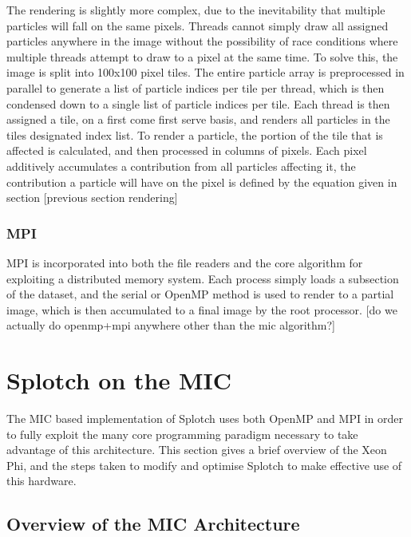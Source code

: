 \documentclass[runningheads,a4paper]{llncs}
\begin{document}
The rendering is slightly more complex, due to the inevitability that multiple particles will fall on the same pixels. 
Threads cannot simply draw all assigned particles anywhere in the image without the possibility of race conditions 
where multiple threads attempt to draw to a pixel at the same time. To solve this, the image is split into 100x100 pixel 
tiles. The entire particle array is preprocessed in parallel to generate a list of particle indices per tile per thread, 
which is then condensed down to a single list of particle indices per tile. Each thread is then assigned a tile, on a 
first come first serve basis, and renders all particles in the tiles designated index list. To render a particle, the 
portion of the tile that is affected is calculated, and then processed in columns of pixels. Each pixel additively 
accumulates a contribution from all particles affecting it, the contribution a particle will have on the pixel is defined 
by the equation given in section [previous section rendering]

\subsubsection{MPI}
\label{sect:mpisplotch}

MPI is incorporated into both the file readers and the core algorithm for exploiting a distributed memory system. Each 
process simply loads a subsection of the dataset, and the serial or OpenMP method is used to render to a partial image, 
which is then accumulated to a final image by the root processor. [do we actually do openmp+mpi anywhere other than 
the mic algorithm?]


\section{Splotch on the MIC}
\label{sect:micsplotch}

The MIC based implementation of Splotch uses both OpenMP and MPI in order to fully exploit the many core 
programming paradigm necessary to take advantage of this architecture. This section gives a brief overview of the 
Xeon Phi, and the steps taken to modify and optimise Splotch to make effective use of this hardware.

\subsection{Overview of the MIC Architecture}
\label{sect:mic}
\end{document}
